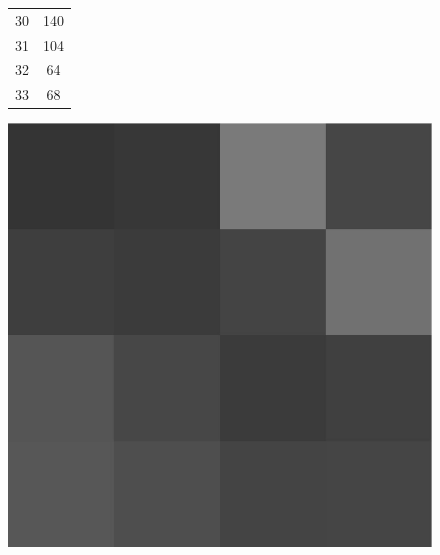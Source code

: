 \documentclass{article}
\begin{document}
\begin{figure}[ht]
\begin{minipage}[c]{.35\linewidth}
\begin{tabular}{c|c}
            30    & 140  \\
            31    & 104  \\
            32    & 64   \\
            33    & 68   \\
        \end{tabular}
        \label{esempio1}
    \end{minipage}%
    \begin{minipage}[c]{.3\linewidth}
        \centering
        \includegraphics[scale=0.25]{immSorg.jpg}
        \label{esempio2}
    \end{minipage}\hspace{20pt}
    \begin{minipage}[c]{.3\linewidth}
        \centering

\end{minipage}
\end{figure}
\end{document}
